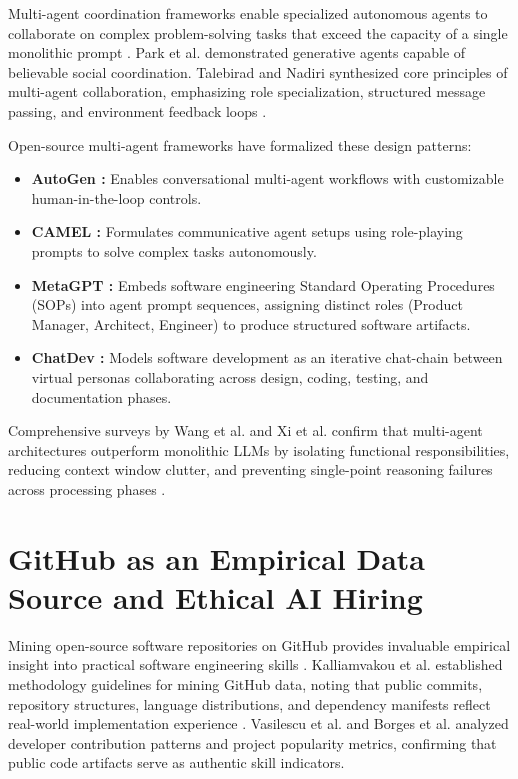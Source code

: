Multi-agent coordination frameworks enable specialized autonomous agents to collaborate on complex problem-solving tasks that exceed the capacity of a single monolithic prompt \cite{ref61, ref62, ref38, ref63, ref43, ref39}. Park et al. \cite{ref38} demonstrated generative agents capable of believable social coordination. Talebirad and Nadiri \cite{ref43} synthesized core principles of multi-agent collaboration, emphasizing role specialization, structured message passing, and environment feedback loops \cite{ref38, ref39}.

Open-source multi-agent frameworks have formalized these design patterns:
\begin{itemize}[leftmargin=*]
    \item \textbf{AutoGen \cite{ref39}:} Enables conversational multi-agent workflows with customizable human-in-the-loop controls.
    \item \textbf{CAMEL \cite{ref62}:} Formulates communicative agent setups using role-playing prompts to solve complex tasks autonomously.
    \item \textbf{MetaGPT \cite{ref61}:} Embeds software engineering Standard Operating Procedures (SOPs) into agent prompt sequences, assigning distinct roles (Product Manager, Architect, Engineer) to produce structured software artifacts.
    \item \textbf{ChatDev \cite{ref63}:} Models software development as an iterative chat-chain between virtual personas collaborating across design, coding, testing, and documentation phases.
\end{itemize}

Comprehensive surveys by Wang et al. \cite{ref64} and Xi et al. \cite{ref44} confirm that multi-agent architectures outperform monolithic LLMs by isolating functional responsibilities, reducing context window clutter, and preventing single-point reasoning failures across processing phases \cite{ref20, ref23, ref64, ref44}.

\section{GitHub as an Empirical Data Source and Ethical AI Hiring}

Mining open-source software repositories on GitHub provides invaluable empirical insight into practical software engineering skills \cite{ref6, ref15, ref25, ref24, ref26, ref36}. Kalliamvakou et al. \cite{ref24} established methodology guidelines for mining GitHub data, noting that public commits, repository structures, language distributions, and dependency manifests reflect real-world implementation experience \cite{ref6, ref25, ref26}. Vasilescu et al. \cite{ref36} and Borges et al. \cite{ref6} analyzed developer contribution patterns and project popularity metrics, confirming that public code artifacts serve as authentic skill indicators.

